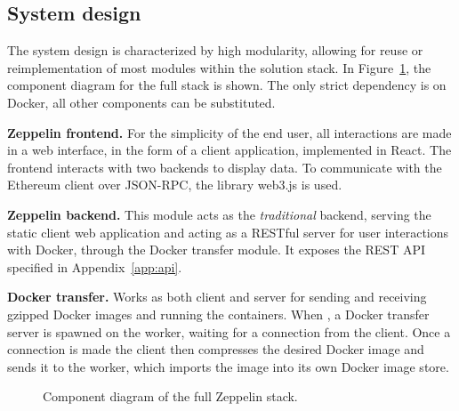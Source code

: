 \subsection{System design}
The system design is characterized by high modularity, allowing for reuse or reimplementation of most modules within the solution stack. In Figure~\ref{zep-stack}, the component diagram for the full stack is shown. The only strict dependency is on Docker, all other components can be substituted.

\textbf{Zeppelin frontend.} For the simplicity of the end user, all interactions are made in a web interface, in the form of a client application, implemented in React. The frontend interacts with two backends to display data. To communicate with the Ethereum client over JSON-RPC, the library web3.js is used.

\textbf{Zeppelin backend.} This module acts as the \textit{traditional} backend, serving the static client web application and acting as a RESTful server for user interactions with Docker, through the Docker transfer module. It exposes the REST API specified in Appendix~\ref{app:api}.

\textbf{Docker transfer.} Works as both client and server for sending and receiving gzipped Docker images and running the containers. When , a Docker transfer server is spawned on the worker, waiting for a connection from the client. Once a connection is made the client then compresses the desired Docker image and sends it to the worker, which imports the image into its own Docker image store.

\begin{figure}[ht]
\centering
{}
\caption{Component diagram of the full Zeppelin stack.}
\label{zep-stack}
\end{figure}

